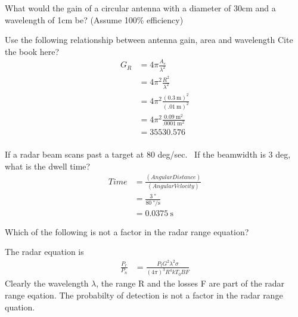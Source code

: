 \documentclass[12pt]{article}
\newenvironment{exercise}[2][Exercise]{\begin{trivlist}
    \item[\hskip \labelsep {\bfseries #1}\hskip \labelsep {\bfseries #2.}]}{\end{trivlist}}
\begin{document}
      \begin{exercise}{2}
      What would the gain of a circular antenna with a diameter of 30cm and a wavelength of 1cm be? (Assume 100\% efficiency)
      
      Use the following relationship between antenna gain, area and wavelength
      Cite the book here?
      \begin{align*}
      G_{R} & = 4 \pi \frac{ A_{e} }{\lambda^{2}} \\
      & = 4 \pi^{2} \frac{ R^{2}}{\lambda^{2}}\\
      & = 4 \pi^{2} \frac{ (\SI{0.3}{\meter})^{2}}{(\SI{.01}{\meter})^{2}}\\
      & = 4 \pi^{2} \frac{\SI{0.09}{\meter\squared}}{\SI{.0001}{\meter\squared}}\\
      & = \SI{35530.576}{}\\
      \end{align*}      
      \end{exercise}
      
      \begin{exercise}{3}
      If a radar beam scans past a target at 80 deg/sec.  If the beamwidth is 3 deg, what is the dwell time?
      \begin{align*}
      Time & = \frac{(Angular Distance)}{(Angular Velocity)}\\
      & = \frac{\SI{3}{\degree}}{\SI{80}{\degree\per\second}}\\
      & = \SI{0.0375}{\second}
      \end{align*}      
      \end{exercise}

      \begin{exercise}{4}
      Which of the following is not a factor in the radar range equation?

      The radar equation is
      \begin{align*}
      \frac{P_{r}}{P_{n}} & = \frac{P_{t}G^{2}\lambda^{2}\sigma}{(4\pi)^{3}R^{4} k T_{0} B F}
      \end{align*}
      Clearly the wavelength $\lambda$, the range R and the losses F are part of the radar range eqation.  The probabilty of detection is not a factor in the radar range quation.
      \end{exercise}
\end{document}
